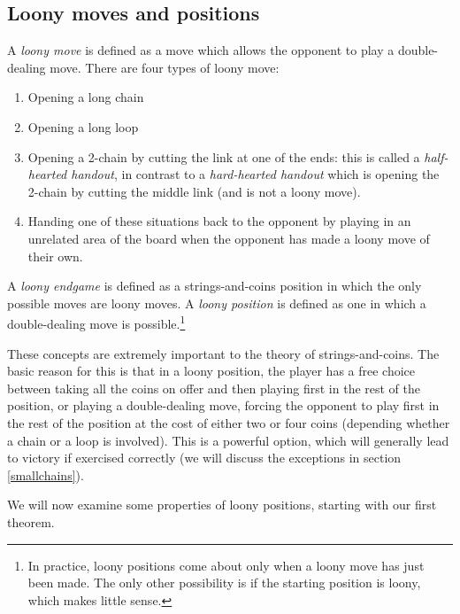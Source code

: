 \documentclass[a4paper,twocolumn]{article}
\begin{document}
\subsection{Loony moves and positions}

A \emph{loony move} is defined as a move which allows the opponent to
play a double-dealing move. There are four types of loony move:

\begin{enumerate}
  \item Opening a long chain
  \item Opening a long loop
  \item Opening a 2-chain by cutting the link at one of the ends:
    this is called a \emph{half-hearted handout}, in contrast to a
    \emph{hard-hearted handout} which is opening the 2-chain by
    cutting the middle link (and is not a loony move).
  \item Handing one of these situations back to the opponent by
    playing in an unrelated area of the board when the opponent has
    made a loony move of their own.
\end{enumerate}

A \emph{loony endgame} is defined as a strings-and-coins position in
which the only possible moves are loony moves. A \emph{loony position}
is defined as one in which a double-dealing move is
possible.\footnote{In practice, loony positions come about only when a
  loony move has just been made. The only other possibility is if the
  starting position is loony, which makes little sense.}

These concepts are extremely important to the theory of
strings-and-coins. The basic reason for this is that in a loony
position, the player has a free choice between taking all the coins on
offer and then playing first in the rest of the position, or playing a
double-dealing move, forcing the opponent to play first in the rest of
the position at the cost of either two or four coins (depending
whether a chain or a loop is involved). This is a powerful option,
which will generally lead to victory if exercised correctly (we will
discuss the exceptions in section \ref{smallchains}).

We will now examine some properties of loony positions, starting with
our first theorem.
\end{document}
